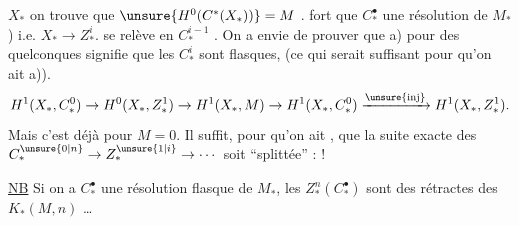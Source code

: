  $X_*$  on trouve que   $\unsure{H^0(C^*(X_*))}=M$ .   fort que $C_*^\bullet$  une résolution de $M_*$) i.e.  $X_*\to Z_*^i$.
se relève en $C_*^{i-1}$ \unsure{--}. On a envie de prouver que a) pour des quelconques signifie que les $C_*^i$ sont flasques, (ce qui serait  suffisant pour qu'on ait a)).
\[
 H^1(X_*,C_*^0)\to H^0(X_*,Z_*^1)\to H^1(X_*,M)\to H^1(X_*,C_*^0)\xrightarrow{\unsure{\text{inj}}} H^1(X_*,Z_*^1).
\]
Mais c'est  déjà pour $M=0$. Il suffit, pour qu'on ait , que la suite exacte  des $C_*^{\unsure{0|n}}\to Z_*^{\unsure{1|i}}\to\cdots$ soit ``splittée''  :  !

\uline{NB} Si on a $C_*^\bullet$ une résolution flasque de $M_*$, les $Z_*^n(C_*^\bullet)$ sont des rétractes des $K_*(M,n)$ \ldots

